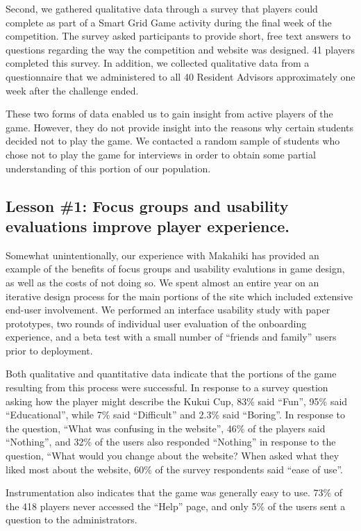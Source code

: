 \documentclass{acm_proc_article-sp}
\begin{document}
Second, we gathered qualitative data through a survey that players could complete as part of a Smart Grid Game activity during the final week of the competition. The survey asked participants to provide short, free text answers to questions regarding the way the competition and website was designed.  41 players completed this survey.  In addition, we collected qualitative data from a questionnaire that we administered to all 40 Resident Advisors approximately one week after the challenge ended. 

These two forms of data enabled us to gain insight from active players of
the game.  However, they do not provide insight into the reasons why
certain students decided not to play the game.  We contacted a random
sample of students who chose not to play the game for interviews in order
to obtain some partial understanding of this portion of our population.

\subsection{Lesson \#1: Focus groups and usability evaluations improve player
  experience.}

Somewhat unintentionally, our experience with Makahiki has provided an
example of the benefits of focus groups and usability evalutions in game
design, as well as the costs of not doing so.  We spent almost an entire
year on an iterative design process for the main portions of the site which
included extensive end-user involvement.  We performed an interface
usability study with paper prototypes, two rounds of individual user
evaluation of the onboarding experience, and a beta test with a small
number of ``friends and family'' users prior to deployment.

Both qualitative and quantitative data indicate that the portions of the
game resulting from this process were successful.  In response to a survey
question asking how the player might describe the Kukui Cup, 83\% said
``Fun'', 95\% said ``Educational'', while 7\% said ``Difficult'' and 2.3\%
said ``Boring''.  In response to the question, ``What was confusing in the
website'', 46\% of the players said ``Nothing'', and 32\% of the users also
responded ``Nothing'' in response to the question, ``What would you change
about the website? When asked what they liked most about the website, 60\%
of the survey respondents said ``ease of use''.

Instrumentation also indicates that the game was generally easy to
use. 73\% of the 418 players never accessed the ``Help'' page, and only 5\%
of the users sent a question to the administrators. 
\end{document}
